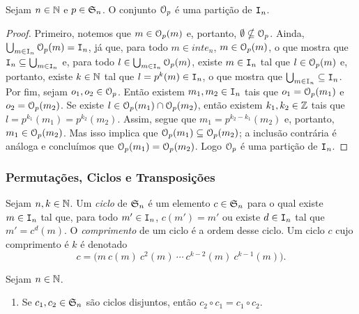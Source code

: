 \begin{prop}
	Sejam $n \in \mathbb{N}$ e $p \in \mathfrak{S}_n$. O conjunto $\mathcal{O}_p$ é uma partição de $\mathtt I_n$.
\end{prop}
\begin{proof}
	Primeiro, notemos que $m \in \mathcal{O}_p(m)$ e, portanto, $\emptyset \nsubseteq \mathcal{O}_p$. Ainda, $\bigcup_{m \in \mathtt I_n} \mathcal{O}_p(m) = \mathtt I_n$, já que, para todo $m \in inte_n$, $m \in \mathcal{O}_p(m)$, o que mostra que $\mathtt I_n \subseteq \bigcup_{m \in \mathtt I_n}$ e, para todo $l \in \bigcup_{m \in \mathtt I_n} \mathcal{O}_p(m)$, existe $m \in \mathtt I_n$ tal que $l \in \mathcal{O}_p(m)$ e, portanto, existe $k \in \mathbb{N}$ tal que $l=p^k(m) \in \mathtt I_n$, o que mostra que $\bigcup_{m \in \mathtt I_n} \subseteq \mathtt I_n$. Por fim, sejam $o_1,o_2 \in \mathcal{O}_p$. Então existem $m_1,m_2 \in \mathtt I_n$ tais que $o_1=\mathcal{O}_p(m_1)$ e $o_2=\mathcal{O}_p(m_2)$. Se existe $l \in \mathcal{O}_p(m_1) \cap \mathcal{O}_p(m_2)$, então existem $k_1,k_2 \in \mathbb{Z}$ tais que $l=p^{k_1}(m_1)=p^{k_2}(m_2)$. Assim, segue que $m_1=p^{k_2-k_1}(m_2)$ e, portanto, $m_1 \in \mathcal{O}_p(m_2)$. Mas isso implica que $\mathcal{O}_p(m_1) \subseteq \mathcal{O}_p(m_2)$; a inclusão contrária é análoga e concluímos que $\mathcal{O}_p(m_1) = \mathcal{O}_p(m_2)$. Logo $\mathcal{O}_p$ é uma partição de $\mathtt I_n$.
\end{proof}

\subsubsection{Permutações, Ciclos e Transposições}

\begin{defi}
	Sejam $n,k \in \mathbb{N}$. Um \emph{ciclo} de $\mathfrak{S}_n$ é um elemento $c \in \mathfrak{S}_n$ para o qual existe $m \in \mathtt I_n$ tal que, para todo $m' \in \mathtt I_n$, $c(m')=m'$ ou existe $d \in \mathtt I_n$ tal que $m'=c^d(m)$. O \emph{comprimento} de um ciclo é a ordem desse ciclo. Um ciclo $c$ cujo comprimento é $k$ é denotado
	\begin{equation*}
	c = \bigl(m \ c(m) \ c^2(m) \ \cdots \  c^{k-2}(m) \ c^{k-1}(m)\bigr).
	\end{equation*}
\end{defi}


\begin{prop}
	Sejam $n \in \mathbb{N}$.
	\begin{enumerate}
	\item Se $c_1,c_2 \in \mathfrak{S}_n$ são ciclos disjuntos, então $c_2 \circ c_1 = c_1 \circ c_2$.
	\end{enumerate}
\end{prop}

